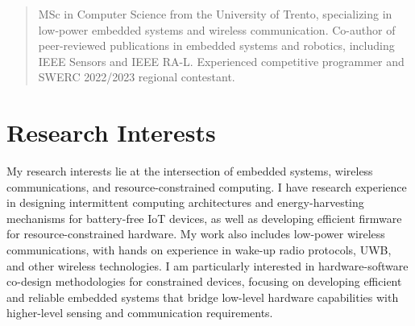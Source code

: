 \documentclass[a4paper,sans]{moderncv}
\begin{document}
\makecvtitle

\begin{quote}
    \small{MSc in Computer Science from the University of Trento, specializing in low-power embedded systems and wireless communication. Co-author of peer-reviewed publications in embedded systems and robotics, including IEEE Sensors and IEEE RA-L. Experienced competitive programmer and SWERC 2022/2023 regional contestant.}
\end{quote}

\section{Research Interests}
\small{My research interests lie at the intersection of embedded systems, wireless communications, and resource-constrained computing. I have research experience in designing intermittent computing architectures and energy-harvesting mechanisms for battery-free IoT devices, as well as developing efficient firmware for resource-constrained hardware. My work also includes low-power wireless communications, with hands on experience in wake-up radio protocols, UWB, and other wireless technologies. I am particularly interested in hardware-software co-design methodologies for constrained devices, focusing on developing efficient and reliable embedded systems that bridge low-level hardware capabilities with higher-level sensing and communication requirements.}
\end{document}
